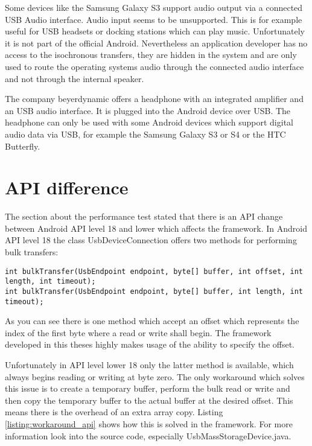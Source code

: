 Some devices like the Samsung Galaxy S3 support audio output via a connected USB Audio interface. Audio input seems to be unsupported. This is for example useful for USB headsets or docking stations which can play music. Unfortunately it is not part of the official Android. Nevertheless an application developer has no access to the isochronous transfers, they are hidden in the system and are only used to route the operating systems audio through the connected audio interface and not through the internal speaker.

The company beyerdynamic offers a headphone with an integrated amplifier and an USB audio interface. It is plugged into the Android device over USB. The headphone can only be used with some Android devices which support digital audio data via USB, for example the Samsung Galaxy S3 or S4 or the HTC Butterfly\cite{beyerdynamic}.

\chapter{API difference}
\label{chapter:api_diff}

The section about the performance test stated that there is an API change between Android API level 18 and lower which affects the framework. In Android API level 18 the class UsbDeviceConnection offers two methods for performing bulk transfers\cite{android_usb_dev_con}:

\lstset{language=Java}
\begin{lstlisting}[caption=Bulk transfers in UsbDeviceConnection., label=listing:wifi_connectg]
int bulkTransfer(UsbEndpoint endpoint, byte[] buffer, int offset, int length, int timeout);
int bulkTransfer(UsbEndpoint endpoint, byte[] buffer, int length, int timeout);
\end{lstlisting}

As you can see there is one method which accept an offset which represents the index of the first byte where a read or write shall begin. The framework developed in this theses highly makes usage of the ability to specify the offset.

Unfortunately in API level lower 18 only the latter method is available, which always begins reading or writing at byte zero. The only workaround which solves this issue is to create a temporary buffer, perform the bulk read or write and then copy the temporary buffer to the actual buffer at the desired offset. This means there is the overhead of an extra array copy. Listing \ref{listing:workaround_api} shows how this is solved in the framework. For more information look into the source code, especially UsbMassStorageDevice.java.

